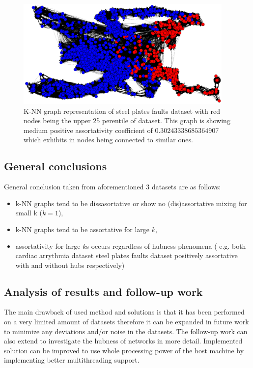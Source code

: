\begin{figure}[h!]
  \centering
  \captionsetup{justification=centering}
    \includegraphics[width=0.95\textwidth]{images/faults_graph.png}
  \caption{K-NN graph representation of steel plates faults dataset with red nodes being the upper 25 perentile of dataset. This graph is showing medium positive assortativity coefficient of $0.30243338685364907$ which exhibits in nodes being connected to similar ones.}
  \label{fig:graph_faults_nodes}
\end{figure}

\subsection{General conclusions}
General conclusion taken from aforementioned 3 datasets are as follows:
\begin{itemize}
\item k-NN graphs tend to be dissasortative or show no (dis)assortative mixing for small k ($k = 1$),
\item k-NN graphs tend to be assortative for large $k$,
\item assortativity for large $k$s occurs regardless of hubness phenomena ( e.g. both cardiac arrythmia dataset steel plates faults dataset positively assortative with and without hubs respectively) 
\end{itemize}


\subsection{Analysis of results and follow-up work}
The main drawback of used method and solutions is that it has been performed on a very limited amount of datasets therefore it can be expanded in future work to minimize any deviations and/or noise in the datasets.
The follow-up work can also extend to investigate the hubness of networks in more detail.
Implemented solution can be improved to use whole processing power of the host machine by implementing better multithreading support.